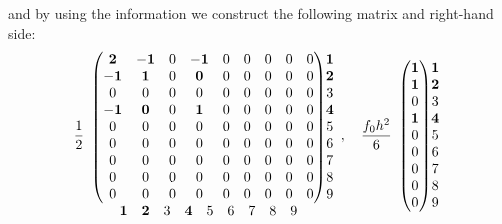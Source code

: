 {and by using the information we construct the following matrix and right-hand side:}
\[\frac12\begin{array}{c@{}c}
\begin{pmatrix}
\mathbf2&\mathbf{-1}&0&\mathbf{-1}&0&0&0&0&0\\
\mathbf{-1}&\mathbf1&0&\mathbf0&0&0&0&0&0\\
0&0&0&0&0&0&0&0&0\\
\mathbf{-1}&\mathbf0&0&\mathbf1&0&0&0&0&0\\
0&0&0&0&0&0&0&0&0\\0&0&0&0&0&0&0&0&0\\0&0&0&0&0&0&0&0&0\\0&0&0&0&0&0&0&0&0\\0&0&0&0&0&0&0&0&0
\end{pmatrix}&\begin{matrix}\mathbf1\\\mathbf2\\3\\\mathbf4\\5\\6\\7\\8\\9\end{matrix}\\
\begin{matrix}\mathbf1&\mathbf2&3&\mathbf4&5&6&7&8&9\end{matrix}&
\end{array},\quad\frac{f_0h^2}{6}\begin{array}{c@{}c}
\begin{pmatrix}\mathbf1\\\mathbf1\\0\\\mathbf1\\0\\0\\0\\0\\0\end{pmatrix}&\begin{matrix}\mathbf1\\\mathbf2\\3\\\mathbf4\\5\\6\\7\\8\\9\end{matrix}
\end{array}\]
